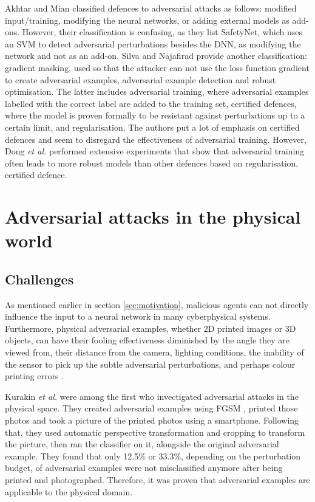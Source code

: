 Akhtar and Mian \cite{akhtar} classified defences to adversarial attacks as follows: modified input/training, modifying the neural networks, or adding external models as add-ons. However, their classification is confusing, as they list SafetyNet, which uses an SVM to detect adversarial perturbations besides the DNN, as modifying the network and not as an add-on. Silva and Najafirad \cite{silva_survey} provide another classification: gradient masking, used so that the attacker can not use the loss function gradient to create adversarial examples, adversarial example detection and robust optimisation. The latter includes adversarial training, where adversarial examples labelled with the correct label are added to the training set, certified defences, where the model is proven formally to be resistant against perturbations up to a certain limit, and regularisation. The authors put a lot of emphasis on certified defences and seem to disregard the effectiveness of adversarial training. However, Dong \textit{et al.} \cite{dong2020benchmarking} performed extensive experiments that show that adversarial training often leads to more robust models than other defences based on regularisation, certified defence.

\section{Adversarial attacks in the physical world}
\subsection{Challenges}

As mentioned earlier in section \ref{sec:motivation}, malicious agents can not directly influence the input to a neural network in many cyberphysical systems. Furthermore, physical adversarial examples, whether 2D printed images or 3D objects, can have their fooling effectiveness diminished by the angle they are viewed from, their distance from the camera, lighting conditions, the inability of the sensor to pick up the subtle adversarial perturbations, and perhaps colour printing errors \cite{kurakin2016adversarial, athalye, evtimov_road_signs}.

Kurakin \textit{et al.} \cite{kurakin2016adversarial} were among the first who invectigated adversarial attacks in the physical space. They created adversarial examples using FGSM \cite{fgsm}, printed those photos and took a picture of the printed photos using a smartphone. Following that, they used automatic perspective transformation and cropping to transform the picture, then ran the classifier on it, alongside the original adversarial example. They found that only 12.5\% or 33.3\%, depending on the perturbation budget, of adversarial examples were not misclassified anymore after being printed and photographed. Therefore, it was proven that adversarial examples are applicable to the physical domain.

